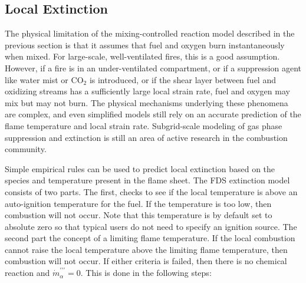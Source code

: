 \subsection{Local Extinction}

\label{extinction}

The physical limitation of the mixing-controlled reaction model described in the previous section is that it assumes that fuel and oxygen burn instantaneously when mixed. For large-scale, well-ventilated
fires, this is a good assumption. However, if a fire is in an
under-ventilated compartment, or if a suppression agent like water
mist or CO$_2$ is introduced, or if the shear layer between fuel and oxidizing streams
has a sufficiently large local strain rate,
fuel and oxygen may mix but may not burn.
The physical mechanisms underlying these phenomena are complex, and
even simplified models still rely on an accurate prediction
of the flame temperature and local strain rate.
Subgrid-scale modeling of gas phase suppression and
extinction is still an area of active research in the combustion
community.

Simple empirical rules can be used to predict local
extinction based on the species and temperature present in the flame sheet.  The FDS extinction model consists of two parts. The first, checks to see if the local temperature is above an auto-ignition temperature for the fuel.  If the temperature is too low, then combustion will not occur.  Note that this temperature is by default set to absolute zero so that typical users do not need to specify an ignition source.  The second part the concept of a limiting flame temperature.  If the local combustion cannot raise the local temperature above the limiting flame temperature, then combustion will not occur. If either criteria is failed, then there is no chemical reaction and $\dot{m}^{\prime\prime\prime}_{\alpha}=0$. This is done in the following steps:


